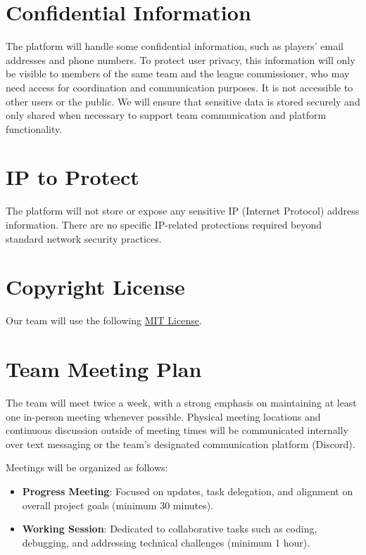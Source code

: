 \documentclass{article}
\begin{document}
\section{Confidential Information}
The platform will handle some confidential information, such as players' email addresses and phone numbers. To protect user privacy, this information will only be visible to members of the same team and the league commissioner, who may need access for coordination and communication purposes. It is not accessible to other users or the public. We will ensure that sensitive data is stored securely and only shared when necessary to support team communication and platform functionality.

\section{IP to Protect}
The platform will not store or expose any sensitive IP (Internet Protocol) address information. There are no specific IP-related protections required beyond standard network security practices.

\section{Copyright License}
Our team will use the following \href{https://github.com/dcheung11/team-6-capstone-project/blob/main/LICENSE}{MIT License}.

\section{Team Meeting Plan}
The team will meet twice a week, with a strong emphasis on maintaining at least one in-person meeting whenever possible. Physical meeting locations and continuous discussion outside of meeting times will be communicated internally over text messaging or the team’s designated communication platform (Discord).

Meetings will be organized as follows:

\begin{itemize}
  \item \textbf{Progress Meeting}: Focused on updates, task delegation, and alignment on overall project goals (minimum 30 minutes).
  \item \textbf{Working Session}: Dedicated to collaborative tasks such as coding, debugging, and addressing technical challenges (minimum 1 hour).
\end{itemize}
\end{document}
